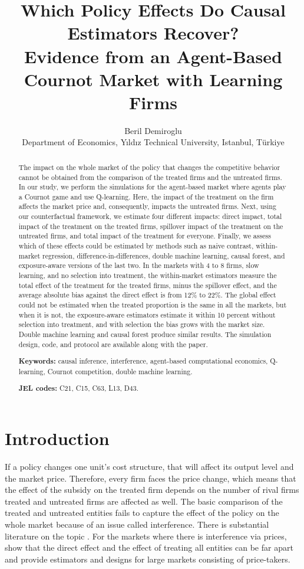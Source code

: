 \documentclass[11pt]{article}
\title{Which Policy Effects Do Causal Estimators Recover?\\Evidence from an Agent-Based Cournot Market with Learning Firms}
\author{Beril Demiroglu\\Department of Economics, Y\i ld\i z Technical University, Istanbul, T\"urkiye\\
}
\date{}
\begin{document}
\maketitle

\begin{abstract}
The impact on the whole market of the policy that changes the competitive behavior cannot be obtained from the comparison of the treated firms and the untreated firms. In our study, we perform the simulations for the agent-based market where agents play a Cournot game and use Q-learning. Here, the impact of the treatment on the firm affects the market price and, consequently, impacts the untreated firms. Next, using our counterfactual framework, we estimate four different impacts: direct impact, total impact of the treatment on the treated firms, spillover impact of the treatment on the untreated firms, and total impact of the treatment for everyone. Finally, we assess which of these effects could be estimated by methods such as naive contrast, within-market regression, difference-in-differences, double machine learning, causal forest, and exposure-aware versions of the last two. In the markets with 4 to 8 firms, slow learning, and no selection into treatment, the within-market estimators measure the total effect of the treatment for the treated firms, minus the spillover effect, and the average absolute bias against the direct effect is from 12\% to 22\%. The global effect could not be estimated when the treated proportion is the same in all the markets, but when it is not, the exposure-aware estimators estimate it within 10 percent without selection into treatment, and with selection the bias grows with the market size. Double machine learning and causal forest produce similar results. The simulation design, code, and protocol are available along with the paper.

\medskip
\noindent\textbf{Keywords:} causal inference, interference, agent-based computational economics, Q-learning, Cournot competition, double machine learning.

\noindent\textbf{JEL codes:} C21, C15, C63, L13, D43.
\end{abstract}

\section{Introduction}
If a policy changes one unit's cost structure, that will affect its output level and the market price. Therefore, every firm faces the price change, which means that the effect of the subsidy on the treated firm depends on the number of rival firms treated and untreated firms are affected as well. The basic comparison of the treated and untreated entities fails to capture the effect of the policy on the whole market because of an issue called interference. There is substantial literature on the topic \citep[see][]{hudgens2008,aronow2017,baird2018,savje2021,hu2022}. For the markets where there is interference via prices, \citet{mkw2025} show that the direct effect and the effect of treating all entities can be far apart and provide estimators and designs for large markets consisting of price-takers.
\end{document}
